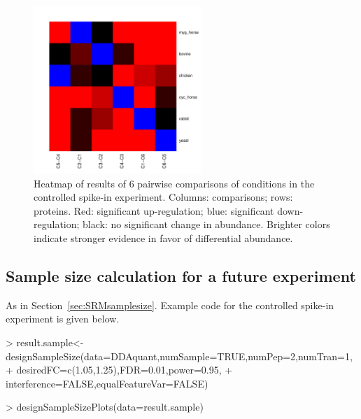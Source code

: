 \documentclass[11pt]{article}
\def\secref#1{Section~\ref{sec:#1}}
\begin{document}
\begin{small}
\begin{Schunk}
\end{Schunk}
\end{small}
\begin{figure}[h!]
\begin{center}
\includegraphics[width=2.5in]{LCMS_Heatmap.pdf}
\vspace{-0.3cm}
\caption{\small Heatmap of results of 6 pairwise comparisons of conditions in the controlled spike-in experiment. Columns: comparisons; rows: proteins. Red: significant up-regulation; blue: significant down-regulation; black: no significant change in abundance. Brighter colors indicate stronger evidence in favor of differential abundance. \label{fig:LCMSheatmap}}
\end{center}
\end{figure}


\subsection{Sample size calculation for a future experiment}

As in \secref{SRMsamplesize}. Example code for the controlled spike-in experiment is given below.

\begin{small}
\begin{Schunk}
\begin{Sinput}
> result.sample<-designSampleSize(data=DDAquant,numSample=TRUE,numPep=2,numTran=1,
+                  desiredFC=c(1.05,1.25),FDR=0.01,power=0.95,
+                  interference=FALSE,equalFeatureVar=FALSE)
\end{Sinput}
\end{Schunk}

\begin{Schunk}
\begin{Sinput}
> designSampleSizePlots(data=result.sample)
\end{Sinput}
\end{Schunk}
\end{small}
\end{document}
